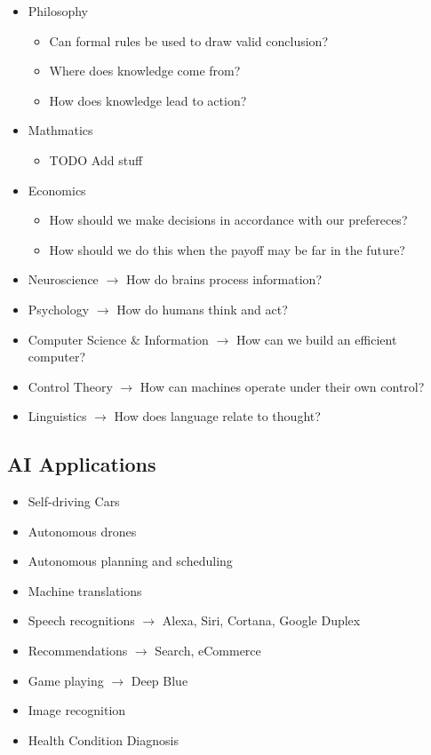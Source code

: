 \documentclass[12pt]{article}
\begin{document}
\begin{itemize}
    \item Philosophy
    \begin{itemize}
        \item Can formal rules be used to draw valid conclusion?
        \item Where does knowledge come from?
        \item How does knowledge lead to action?
    \end{itemize}
    
    \item Mathmatics
    \begin{itemize}
        \item TODO Add stuff
    \end{itemize}

    \item Economics
    \begin{itemize}
        \item How should we make decisions in accordance with our prefereces?
        \item How should we do this when the payoff may be far in the future?
    \end{itemize}

    \item Neuroscience $\to$ How do brains process information?
    \item Psychology $\to$ How do humans think and act?
    \item Computer Science \& Information $\to$ How can we build an efficient computer?
    \item Control Theory $\to$ How can machines operate under their own control?
    \item Linguistics $\to$ How does language relate to thought?

\end{itemize}


\subsection*{AI Applications}

\begin{itemize}
    \item Self-driving Cars
    \item Autonomous drones
    \item Autonomous planning and scheduling
    \item Machine translations
    \item Speech recognitions $\to$ Alexa, Siri, Cortana, Google Duplex
    \item Recommendations $\to$ Search, eCommerce
    \item Game playing $\to$ Deep Blue
    \item Image recognition
    \item Health Condition Diagnosis
\end{itemize}
\end{document}
